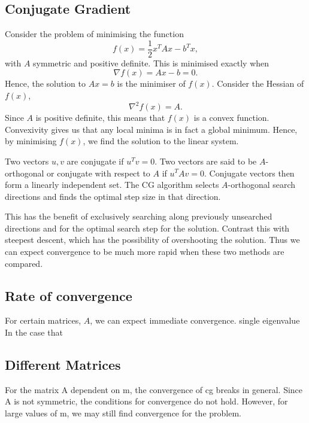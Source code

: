 \subsection{Conjugate Gradient}
\label{sec:cg}




Consider the problem of minimising the function
\[
    f(x) = \frac{1}{2} x^T A x - b^T x,
\]
with $A$ symmetric and positive definite. This is minimised exactly when 
\[
    \nabla f(x) = A x - b = 0.
\]
Hence, the solution to $Ax=b$ is the minimiser of $f(x)$.
Consider the Hessian of $f(x)$,
\[
    \nabla^2 f(x) = A.
\]
Since $A$ is positive definite, this means that $f(x)$ is a convex function.
Convexivity gives us that any local minima is in fact a global minimum.
Hence, by minimising $f(x)$, we find the solution to the linear system.

Two vectors $u, v$ are conjugate if $u^T v = 0$. 
Two vectors are said to be $A$-orthogonal or conjugate with respect to $A$ if $u^T A v = 0$.
Conjugate vectors then form a linearly independent set.
The CG algorithm selects $A$-orthogonal search directions and finds the optimal step size in that direction.

This has the benefit of exclusively searching along previously unsearched directions and for the optimal search step for the solution.
Contrast this with steepest descent, which has the possibility of overshooting the solution.
Thus we can expect convergence to be much more rapid when these two methods are compared.


\subsection{Rate of convergence}

For certain matrices, $A$, we can expect immediate convergence. single eigenvalue
In the case that 


\subsection{Different Matrices}

\iffalse

For the matrix A dependent on m, the convergence of cg breaks in general.
Since A is not symmetric, the conditions for convergence do not hold.
However, for large values of m, we may still find convergence for the problem.

